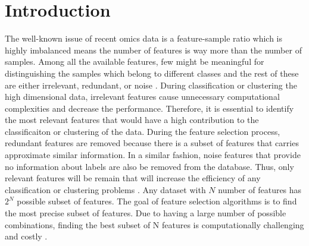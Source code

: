 \documentclass{bioinfo}
\begin{document}
\section{Introduction} \label{intro}
The well-known issue of recent omics data is a feature-sample ratio which is highly imbalanced means the number of features is way more than the number of samples. Among all the available features, few might be meaningful for distinguishing the samples which belong to different classes and the rest of these are either irrelevant, redundant, or noise \citep{pirgazi2019efficient}. During classification or clustering the high dimensional data, irrelevant features cause unnecessary computational complexities and decrease the performance. Therefore, it is essential to identify the most relevant features that would have a high contribution to the classificaiton or clustering of the data. During the feature selection process, redundant features are removed because there is a subset of features that carries approximate similar information. In a similar fashion, noise features that provide no information about labels are also be removed from the database. Thus, only relevant features will be remain that will increase the efficiency of any classification or clustering problems \cite{liu2012feature}. 
Any dataset with $N$ number of features has $2^N$ possible subset of features. The goal of feature selection algorithms is to find the most precise subset of features. Due to having a large number of possible combinations, finding the best subset of N features is computationally challenging and costly \cite{liang2018review}.
\end{document}
